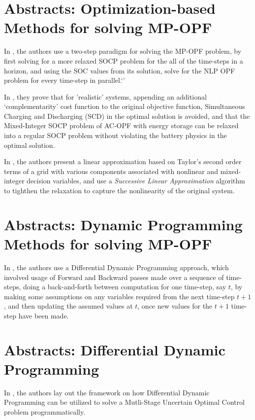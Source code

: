 \chapter{Abstracts: Optimization-based Methods for solving MP-OPF}
In \cite{Nazir2019Jun}, the authors use a two-step paradigm for solving the MP-OPF problem, by first solving for a more relaxed SOCP problem for the all of the time-steps in a horizon, and using the SOC values from its solution, solve for the NLP OPF problem for every time-step in parallel.`'

In \cite{Nazir2018Jun}, they prove that for 'realistic' systems, appending an additional `complementarity' cost function to the original objective function, Simultaneous Charging and Discharging (SCD) in the optimal solution is avoided, and that the Mixed-Integer SOCP problem of AC-OPF with energy storage can be relaxed into a regular SOCP problem without violating the battery physics in the optimal solution.

In \cite{usman01}, the authors present a linear approximation based on Taylor's second order terms of a grid with various components associated with nonlinear and mixed-integer decision variables, and use a \textit{Successive Linear Approximation} algorithm to tighthen the relaxation to capture the nonlinearity of the original system.

\chapter{Abstracts: Dynamic Programming Methods for solving MP-OPF}

In \cite{ddp_sugar_01}, the authors use a Differential Dynamic Programming approach, which involved usage of Forward and Backward passes made over a sequence of time-steps, doing a back-and-forth between computation for one time-step, say $t$, by making some assumptions on any variables required from the next time-step $t+1$, and then updating the assumed values at $t$, once new values for the $t+1$ time-step have been made.

\chapter{Abstracts: Differential Dynamic Programming}

In \cite{Qian2014Jul}, the authors lay out the framework on how Differential 
Dynamic Programming can be utilized to solve a Mutli-Stage Uncertain 
Optimal Control problem programmatically.




